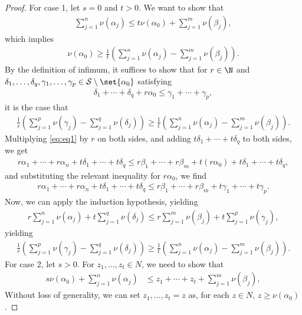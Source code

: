 \documentclass[10pt]{mypackage}
\begin{document}
\begin{proof}
    For case 1, let $s = 0$ and $t > 0$. We want to show that
    \begin{align*}
      \sum_{j=1}^{n}\nu\left(\alpha_j\right) \leq t\nu\left(\alpha_0\right) + \sum_{j=1}^{m}\nu\left(\beta_j\right),
    \end{align*}
    which implies
    \begin{align*}
      \nu\left(\alpha_0\right) \geq \frac{1}{t}\left(\sum_{j=1}^{n}\nu\left(\alpha_j\right) - \sum_{j=1}^{m}\nu\left(\beta_j\right)\right).
    \end{align*}
    By the definition of infimum, it suffices to show that for $r\in\N$ and $\delta_1,\dots,\delta_q,\gamma_1,\dots,\gamma_p\in \mathcal{S}\setminus \set{\alpha_0}$ satisfying
    \begin{align*}
      \delta_1 + \cdots + \delta_q + r\alpha_0 \leq \gamma_1 + \cdots + \gamma_p,
    \end{align*}
    it is the case that
    \begin{align*}
      \frac{1}{r}\left(\sum_{j=1}^{p}\nu\left(\gamma_j\right) - \sum_{j=1}^{q}\nu\left(\delta_j\right)\right) \geq \frac{1}{t}\left(\sum_{j=1}^{n}\nu\left(\alpha_j\right) - \sum_{j=1}^{m}\nu\left(\beta_j\right)\right).
    \end{align*}
    Multiplying \ref{eq:eq1} by $r$ on both sides, and adding $t\delta_1 + \cdots + t\delta_q$ to both sides, we get
    \begin{align*}
      r\alpha_1 + \cdots + r\alpha_n + t\delta_1 + \cdots + t\delta_q \leq r\beta_1 + \cdots + r\beta_m + t\left(r\alpha_0\right) + t\delta_1 + \cdots + t\delta_q,
    \end{align*}
    and substituting the relevant inequality for $r\alpha_0$, we find
    \begin{align*}
      r\alpha_1 + \cdots + r\alpha_n + t\delta_1 + \cdots + t\delta_q \leq r\beta_1 + \cdots + r\beta_m + t\gamma_1 + \cdots + t\gamma_p.
    \end{align*}
    Now, we can apply the induction hypothesis, yielding
    \begin{align*}
      r\sum_{j=1}^{n}\nu\left(\alpha_j\right) + t\sum_{j=1}^{q}\nu\left(\delta_j\right) \leq r\sum_{j=1}^{m}\nu\left(\beta_j\right) + t\sum_{j=1}^{p}\nu\left(\gamma_j\right),
    \end{align*}
    yielding
    \begin{align*}
      \frac{1}{r}\left(\sum_{j=1}^{p}\nu\left(\gamma_j\right) - \sum_{j=1}^{q}\nu\left(\delta_j\right)\right) \geq \frac{1}{t}\left(\sum_{j=1}^{n}\nu\left(\alpha_j\right) - \sum_{j=1}^{m}\nu\left(\beta_j\right)\right).
    \end{align*}
    For case 2, let $s > 0$. For $z_1,\dots,z_t\in N$, we need to show that
    \begin{align*}
      s\nu\left(\alpha_0\right) + \sum_{j=1}^{n}\nu\left(\alpha_j\right) &\leq z_1 + \cdots + z_t + \sum_{j=1}^{m}\nu\left(\beta_j\right),
    \end{align*}
    Without loss of generality, we can set $z_1,\dots,z_t = z$ as, for each $z\in N$, $z \geq \nu(\alpha_0)$.\newline


\end{proof}
\end{document}
